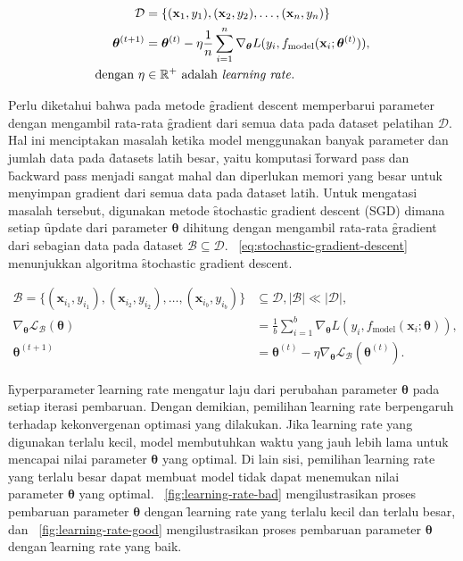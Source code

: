     \begin{align}
        \mathcal{D} &= \{(\mathbf{x}_1, y_1), (\mathbf{x}_2, y_2), \dots, (\mathbf{x}_n, y_n)\} \\
        \label{eq:gradient-descent}
        \bm{\theta}^{(t+1)} &= \bm{\theta}^{(t)} - \eta \frac{1}{n} \sum_{i=1}^{n} \nabla_{\bm{\theta}} L(y_i, f_{\text{model}}(\mathbf{x}_i; \bm{\theta}^{(t)})), \\
        \text{dengan } \eta &\in \mathbb{R}^+ \text{ adalah \textit{learning rate}}.
    \end{align}

    Perlu diketahui bahwa pada metode \f{gradient descent} memperbarui parameter dengan mengambil rata-rata \f{gradient} dari semua data pada \f{dataset} pelatihan $\mathcal{D}$. Hal ini menciptakan masalah ketika model menggunakan banyak parameter dan jumlah data pada \f{datasets} latih besar, yaitu komputasi \f{forward pass} dan \f{backward pass} menjadi sangat mahal dan diperlukan memori yang besar untuk menyimpan gradient dari semua data pada \f{dataset} latih. Untuk mengatasi masalah tersebut, digunakan metode \f{stochastic gradient descent} (SGD) dimana setiap \f{update} dari parameter $\bm{\theta}$ dihitung dengan mengambil rata-rata \f{gradient} dari sebagian data pada \f{dataset} $\mathcal{B}\subseteq\mathcal{D}$. \equ~\ref{eq:stochastic-gradient-descent} menunjukkan algoritma \f{stochastic gradient descent}.

    \begin{align}
        \mathcal{B} = \{(\mathbf{x}_{i_1}, y_{i_1}), (\mathbf{x}_{i_2}, y_{i_2}), \dots, (\mathbf{x}_{i_b}, y_{i_b})\} &\subseteq \mathcal{D}, \mid \mathcal{B} \mid \ll \mid \mathcal{D} \mid, \\
        \label{eq:stochastic-gradient-descent-approx}
        \nabla_{\bm{\theta}}{\mathcal{L_B}}(\bm{\theta}) &= 
         \frac{1}{b} \sum_{i=1}^{b} \nabla_{\bm{\theta}} L(y_{i}, f_{\text{model}}(\mathbf{x}_{i}; \bm{\theta})), \\
        \label{eq:stochastic-gradient-descent}
        \bm{\theta}^{(t+1)} &= \bm{\theta}^{(t)} - \eta \nabla_{\bm{\theta}} \mathcal{L_B}(\bm{\theta}^{(t)}).
    \end{align}



\f{hyperparameter} \f{learning rate} mengatur laju dari perubahan parameter $\bm{\theta}$ pada setiap iterasi pembaruan. Dengan demikian, pemilihan \f{learning rate} berpengaruh terhadap kekonvergenan optimasi yang dilakukan. Jika \f{learning rate} yang digunakan terlalu kecil, model membutuhkan waktu yang jauh lebih lama untuk mencapai nilai parameter $\bm{\theta}$ yang optimal. Di lain sisi, pemilihan \f{learning rate} yang terlalu besar dapat membuat model tidak dapat menemukan nilai parameter $\bm{\theta}$ yang optimal. \pic~\ref{fig:learning-rate-bad} mengilustrasikan proses pembaruan parameter $\bm{\theta}$ dengan \f{learning rate} yang terlalu kecil dan terlalu besar, dan \pic~\ref{fig:learning-rate-good} mengilustrasikan proses pembaruan parameter $\bm{\theta}$ dengan \f{learning rate} yang baik.

